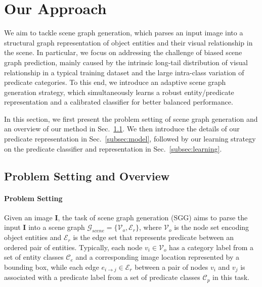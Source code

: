 \section{Our Approach}  %


We aim to tackle scene graph generation, which parses an input image into a structural graph representation of object entities and their visual relationship in the scene.  In particular, we focus on addressing the challenge of biased scene graph prediction, mainly caused by the intrinsic long-tail distribution of visual relationship in a typical training dataset and the large intra-class variation of predicate categories. 
To this end, we introduce an adaptive scene graph generation strategy, which simultaneously learns a robust entity/predicate representation and a calibrated classifier for better balanced performance.  

In this section, we first present the problem setting of scene graph generation and an overview of our method in Sec.~\ref{subsec:problem}. We then introduce the details of our predicate representation in Sec.~\ref{subsec:model}, followed by our learning strategy on the predicate classifier and representation in Sec.~\ref{subsec:learning}. 







\subsection{Problem Setting and Overview}\label{subsec:problem}

\paragraph{Problem Setting} 
Given an image $\mathbf{I}$, %
the task of scene graph generation (SGG) aims to parse the input $\mathbf{I}$ into a scene graph $\mathcal{G}_{scene}=\{\mathcal{V}_o,\mathcal{E}_r\}$, where $\mathcal{V}_o$ is the node set encoding object entities and $\mathcal{E}_r$ is the edge set that represents predicate between an ordered pair of entities. 
Typically, each node $v_i\in \mathcal{V}_o$ has a category label from a set of entity classes $\mathcal{C}_e$ and a corresponding image location represented by a bounding box, while each edge  
$e_{i\to j} \in \mathcal{E}_r $ between a pair of nodes $v_i$ and $v_j$ is associated with a predicate label from a set of predicate classes $\mathcal{C}_p$ in this task.


